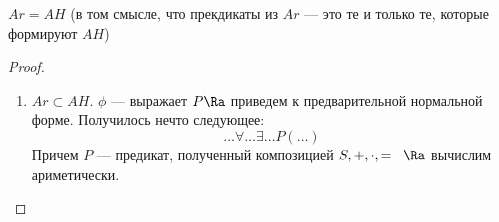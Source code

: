 \begin{theorem}
    \(Ar = AH\) (в том смысле, что прекдикаты из \(Ar\) --- это те и только те, которые формируют \(AH\))
\end{theorem}
\begin{proof}\indent
    \begin{enumerate}
        \item[] \(Ar \subset AH\). \(\phi\) --- выражает \(P \Ra\) приведем к предварительной нормальной форме. Получилось нечто следующее:
        \[\dots \forall \dots \exists \dots P(\dots)\]
        Причем \(P\) --- предикат, полученный композицией \(S, +, \cdot, =\;\;\Ra\) вычислим ариметически.
    \end{enumerate}
\end{proof}
